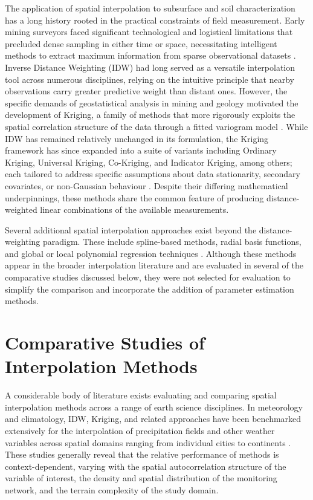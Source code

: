 The application of spatial interpolation to subsurface and soil characterization has a long history rooted in the practical constraints of field measurement. Early mining surveyors faced significant technological and logistical limitations that precluded dense sampling in either time or space, necessitating intelligent methods to extract maximum information from sparse observational datasets \cite{krigHistory, spatInt_hist}. Inverse Distance Weighting (IDW) had long served as a versatile interpolation tool across numerous disciplines, relying on the intuitive principle that nearby observations carry greater predictive weight than distant ones. However, the specific demands of geostatistical analysis in mining and geology motivated the development of Kriging, a family of methods that more rigorously exploits the spatial correlation structure of the data through a fitted variogram model \cite{krigHistory}. While IDW has remained relatively unchanged in its formulation, the Kriging framework has since expanded into a suite of variants including Ordinary Kriging, Universal Kriging, Co-Kriging, and Indicator Kriging, among others; each tailored to address specific assumptions about data stationarity, secondary covariates, or non-Gaussian behaviour \cite{kriging_overview}. Despite their differing mathematical underpinnings, these methods share the common feature of producing distance-weighted linear combinations of the available measurements.

Several additional spatial interpolation approaches exist beyond the distance-weighting paradigm. These include spline-based methods, radial basis functions, and global or local polynomial regression techniques \cite{mitas1999spatial}. Although these methods appear in the broader interpolation literature and are evaluated in several of the comparative studies discussed below, they were not selected for evaluation to simplify the comparison and incorporate the addition of parameter estimation methods.

\section{Comparative Studies of Interpolation Methods}
\label{sec:comp_int_methods}

A considerable body of literature exists evaluating and comparing spatial interpolation methods across a range of earth science disciplines. In meteorology and climatology, IDW, Kriging, and related approaches have been benchmarked extensively for the interpolation of precipitation fields and other weather variables across spatial domains ranging from individual cities to continents \cite{rainWater_spatComp, rainWater_spatComp2}. These studies generally reveal that the relative performance of methods is context-dependent, varying with the spatial autocorrelation structure of the variable of interest, the density and spatial distribution of the monitoring network, and the terrain complexity of the study domain.

